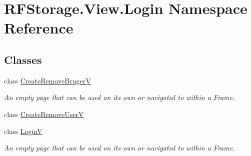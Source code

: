 \hypertarget{namespace_r_f_storage_1_1_view_1_1_login}{}\section{R\+F\+Storage.\+View.\+Login Namespace Reference}
\label{namespace_r_f_storage_1_1_view_1_1_login}
\subsection*{Classes}
\begin{DoxyCompactItemize}
\item 
class \mbox{\hyperlink{class_r_f_storage_1_1_view_1_1_login_1_1_create_remove_bruger_v}{Create\+Remove\+BrugerV}}
\begin{DoxyCompactList}\small\item\em An empty page that can be used on its own or navigated to within a Frame. \end{DoxyCompactList}\item 
class \mbox{\hyperlink{class_r_f_storage_1_1_view_1_1_login_1_1_create_remove_user_v}{Create\+Remove\+UserV}}
\item 
class \mbox{\hyperlink{class_r_f_storage_1_1_view_1_1_login_1_1_login_v}{LoginV}}
\begin{DoxyCompactList}\small\item\em An empty page that can be used on its own or navigated to within a Frame. \end{DoxyCompactList}\end{DoxyCompactItemize}
